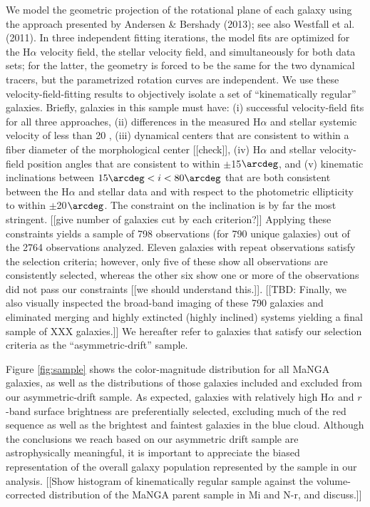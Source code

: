 \documentclass[apj,iop,revtex4,numberedappendix]{emulateapj}
\begin{document}
We model the geometric projection of the rotational plane of each galaxy
using the approach presented by Andersen \& Bershady (2013); see also
Westfall et al. (2011).  In three independent fitting iterations, the
model fits are optimized for the H$\alpha$ velocity field, the stellar
velocity field, and simultaneously for both data sets; for the latter,
the geometry is forced to be the same for the two dynamical tracers, but
the parametrized rotation curves are independent.  We use these
velocity-field-fitting results to objectively isolate a set of
``kinematically regular'' galaxies.  Briefly, galaxies in this sample
must have: (i) successful velocity-field fits for all three approaches,
(ii) differences in the measured H$\alpha$ and stellar systemic velocity
of less than 20 \kms, (iii) dynamical centers that are consistent to
within a fiber diameter of the morphological center [[check]], (iv)
H$\alpha$ and stellar velocity-field position angles that are consistent
to within $\pm$15$\arcdeg$, and (v) kinematic inclinations between
$15\arcdeg < i < 80\arcdeg$ that are both consistent between the
H$\alpha$ and stellar data and with respect to the photometric
ellipticity to within $\pm$20$\arcdeg$.  The constraint on the
inclination is by far the most stringent. [[give number of galaxies cut
by each criterion?]]  Applying these constraints yields a sample of 798
observations (for 790 unique galaxies) out of the 2764 observations
analyzed.  Eleven galaxies with repeat observations satisfy the
selection criteria; however, only five of these show all observations
are consistently selected, whereas the other six show one or more of the
observations did not pass our constraints [[we should understand
this.]].  [[TBD: Finally, we also visually inspected the broad-band
imaging of these 790 galaxies and eliminated merging and highly
extincted (highly inclined) systems yielding a final sample of XXX
galaxies.]]  We hereafter refer to galaxies that satisfy our selection
criteria as the ``asymmetric-drift'' sample.

Figure \ref{fig:sample} shows the color-magnitude distribution for all
MaNGA galaxies, as well as the distributions of those galaxies included
and excluded from our asymmetric-drift sample.  As expected, galaxies
with relatively high H$\alpha$ and $r$-band surface brightness are
preferentially selected, excluding much of the red sequence as well as
the brightest and faintest galaxies in the blue cloud.  Although the
conclusions we reach based on our asymmetric drift sample are
astrophysically meaningful, it is important to appreciate the biased
representation of the overall galaxy population represented by the
sample in our analysis.  [[Show histogram of kinematically regular
sample against the volume-corrected distribution of the MaNGA parent
sample in Mi and N-r, and discuss.]]
\end{document}
